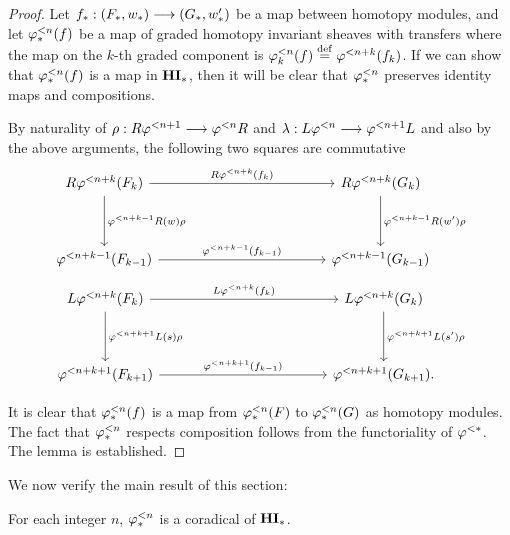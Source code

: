 \begin{proof}
Let $f_*: (F_*,\deloop_*) \to (G_*, \deloop_*')$ be a map between 
homotopy modules, and let $\tlHM{n}(f)$ be a map of graded 
homotopy invariant sheaves with transfers where the map on the 
$k$-th graded component is $\tlHM[k]{n}(f) \defeq \tlHI{n + k}(f_k)$. 
If we can show that $\tlHM{n}(f)$ is a map in $\HM$, then it will
be clear that $\tlHM{n}$ preserves identity maps and compositions.

By naturality of $\rho : R\tlHI{n + 1} \to \tlHI{n} R$ and 
$\lambda: L\tlHI{n} \to \tlHI{n + 1}L$ and also by the above 
arguments, the following two squares are commutative
\[
\begin{tikzcd}[column sep=12em, row sep=huge]
R\tlHI{n + k}(F_k) \arrow{r}{R \tlHI{n + k}(f_k)} 
   \arrow{d}{\tlHI{n + k - 1}R(\deloop) \rho} &
R\tlHI{n + k}(G_k) 
   \arrow{d}{\tlHI{n + k - 1}R(\deloop') \rho} \\
\tlHI{n + k - 1}(F_{k - 1}) 
   \arrow{r}{\tlHI{n + k - 1}(f_{k - 1})} &
\tlHI{n + k - 1}(G_{k - 1}) 
\end{tikzcd}
\]
\[
\begin{tikzcd}[column sep=12em, row sep=huge]
L\tlHI{n + k}(F_k) \arrow{r}{L \tlHI{n + k}(f_k)} 
   \arrow{d}{\tlHI{n + k + 1}L(\susp) \rho} &
L\tlHI{n + k}(G_k) 
   \arrow{d}{\tlHI{n + k + 1}L(\susp') \rho} \\
\tlHI{n + k + 1}(F_{k + 1}) 
   \arrow{r}{\tlHI{n + k + 1}(f_{k - 1})} &
\tlHI{n + k + 1}(G_{k + 1}).
\end{tikzcd}
\]

It is clear that $\tlHM{n}(f)$ is a map from $\tlHM{n}(F)$ to 
$\tlHM{n}(G)$ as homotopy modules. The fact that $\tlHM{n}$ 
respects composition follows from the functoriality of $\tlHI{*}$.
The lemma is established.
\end{proof}

We now verify the main result of this section:

\begin{thm}\label{thm_tlHM_corad}
For each integer $n$, $\tlHM{n}$ is a coradical of $\HM$.
\end{thm}

